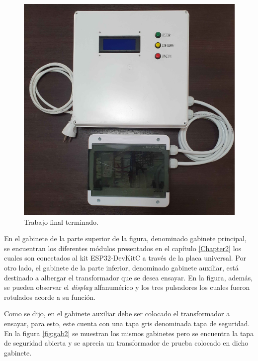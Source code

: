 \begin{figure}[htpb]
	\centering
	\includegraphics[scale=0.16]{./Figures/gab1.jpg}
	\caption{Trabajo final terminado.}
	\label{fig:gab1}
\end{figure}

En el gabinete de la parte superior de la figura, denominado gabinete principal, se encuentran los diferentes módulos presentados en el capítulo \ref{Chapter2} los cuales son conectados al kit ESP32-DevKitC a través de la placa universal. Por otro lado, el gabinete de la parte inferior, denominado gabinete auxiliar, está destinado a albergar el transformador que se desea ensayar. En la figura, además, se pueden observar el \textit{display} alfanumérico y los tres pulsadores los cuales fueron rotulados acorde a su función. 

Como se dijo, en el gabinete auxiliar debe ser colocado el transformador a ensayar, para esto, este cuenta con una tapa gris denominada tapa de seguridad. En la figura \ref{fig:gab2} se muestran los mismos gabinetes pero se encuentra la tapa de seguridad abierta y se aprecia un transformador de prueba colocado en dicho gabinete. 

